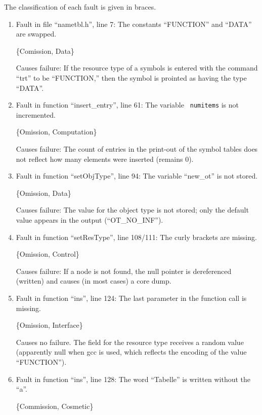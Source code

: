 %
%

The classification of each fault is given in braces.

\begin{enumerate}

\item Fault in file ``nametbl.h'', line 7:  The constants ``FUNCTION''
and ``DATA'' are swapped.

\{Comission, Data\}

Causes failure: If the resource type of a symbols is entered with the
command ``trt'' to be ``FUNCTION,'' then the symbol is prointed as
having the type ``DATA''.

\item Fault in function ``insert\_entry'', line 61: The variable {\tt
numitems} is not incremented.

\{Omission, Computation\}

Causes failure: The count of entries in the print-out of the symbol
tables does not reflect how many elements were inserted (remains 0).

\item Fault in function ``setObjType'', line 94: The variable ``new\_ot'' 
is not stored.

\{Omission, Data\}

Causes failure: The value for the object type is not stored; only the
default value appears in the output (``OT\_NO\_INF'').

\item Fault in function ``setResType'', line 108/111: The curly
brackets are missing.

\{Omission, Control\}

Causes failure: If a node is not found, the null pointer is
dereferenced (written) and causes (in most cases) a core dump.

\item Fault in function ``ins'', line 124: The last parameter in the
function call is missing.

\{Omission, Interface\}

Causes no failure.  The field for the resource type receives a 
random value (apparently null when gcc is used, which reflects the
encoding of the value ``FUNCTION'').

\item Fault in function ``ins'', line 128: The word ``Tabelle'' is
written without the ``a''.

\{Commission, Cosmetic\}


\end{enumerate}
